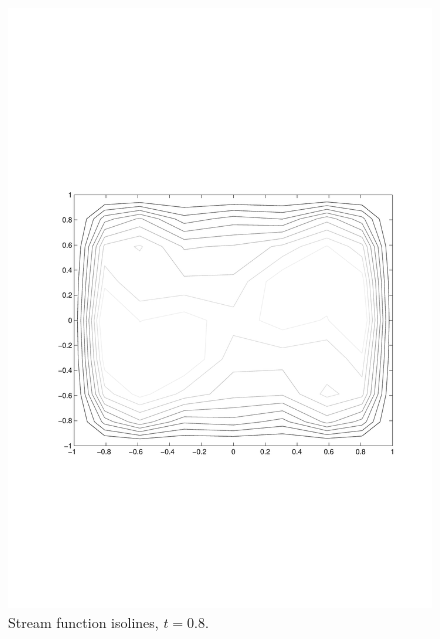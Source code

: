 \begin{multicols}{2}

\begin{figure}[H]
\centering
\includegraphics[scale=0.45, trim = 30mm 75mm 15mm 80mm, clip]{./Figures/4-IVBP/stream_t_8.pdf}
\caption{Stream function isolines, $t=0.8$.
}
\end{figure}


\columnbreak


\end{multicols}

